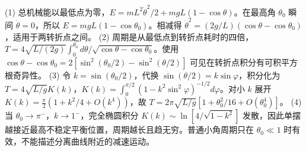 (1) 总机械能以最低点为零，\(E=mL^2\dot\theta^2/2+mgL(1-\cos\theta)\)。在最高角 \(\theta_0\) 瞬间 \(\dot\theta=0\)，所以 \(E=mgL(1-\cos\theta_0)\)。相减得 \(\dot\theta^2=(2g/L)(\cos\theta-\cos\theta_0)\)，适用于两转折点之间。
(2) 周期是从最低点到转折点耗时的四倍，\(T=4\sqrt{L/(2g)}\int_0^{\theta_0}d\theta/\sqrt{\cos\theta-\cos\theta_0}\)。使用 \(\cos\theta-\cos\theta_0=2[\sin^2(\theta_0/2)-\sin^2(\theta/2)]\) 可见在转折点积分有可积平方根奇异性。
(3) 令 \(k=\sin(\theta_0/2)\)，代换 \(\sin(\theta/2)=k\sin\varphi\)，积分化为 \(T=4\sqrt{L/g}K(k)\)，\(K(k)=\int_0^{\pi/2}(1-k^2\sin^2\varphi)^{-1/2}d\varphi\)。对小 \(k\) 展开 \(K(k)=\frac\pi2(1+k^2/4+O(k^4))\)，故 \(T=2\pi\sqrt{L/g}[1+\theta_0^2/16+O(\theta_0^4)]\)。
(4) 当 \(\theta_0\to\pi^-\)，\(k\to1^-\)，完全椭圆积分 \(K(k)\sim\ln[4/\sqrt{1-k^2}]\) 发散，因此单摆越接近最高不稳定平衡位置，周期越长且趋无穷。普通小角周期只在 \(\theta_0\ll1\) 时有效，不能描述分离曲线附近的减速运动。
